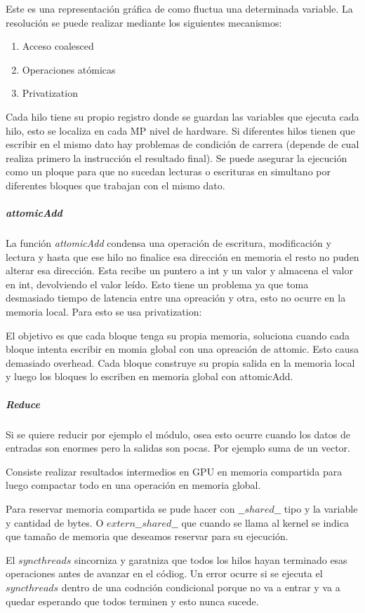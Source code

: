 \documentclass[]{scrartcl}
\begin{document}
Este es una representación gráfica de como fluctua una determinada variable. La resolución se puede realizar mediante los siguientes mecanismos:

\begin{enumerate}
	\item Acceso coalesced
	\item Operaciones atómicas
	\item Privatization
\end{enumerate}

Cada hilo tiene su propio registro donde se guardan las variables que ejecuta cada hilo, esto se localiza en cada MP nivel de hardware. Si diferentes hilos tienen que escribir en el mismo dato hay problemas de condición de carrera (depende de cual realiza primero la instrucción el resultado final). Se puede asegurar la ejecución como un ploque para que no sucedan lecturas o escrituras en simultano por diferentes bloques que trabajan con el mismo dato.
\subparagraph{attomicAdd}
La función \emph{attomicAdd} condensa una operación de escritura, modificación y lectura y hasta que ese hilo no finalice esa dirección en memoria el resto no puden alterar esa dirección. Esta recibe un puntero a int y un valor y almacena el valor en int, devolviendo el valor leído. Esto tiene un problema ya que toma desmasiado tiempo de latencia entre una opreación y otra, esto no ocurre en la memoria local. Para esto se usa privatization:

El objetivo es que cada bloque tenga su propia memoria, soluciona cuando cada bloque intenta escribir en momia global con una opreación de attomic. Esto causa demasiado overhead. Cada bloque construye su propia salida en la memoria local y luego los bloques lo escriben en memoria global con attomicAdd. 

\subparagraph{Reduce}
Si se quiere reducir por ejemplo el módulo, osea esto ocurre cuando los datos de entradas son enormes pero la salidas son pocas. Por ejemplo suma de un vector. 

Consiste realizar resultados intermedios en GPU en memoria compartida para luego compactar todo en una operación en memoria global.
  
Para reservar memoria compartida se pude hacer con $\_\_shared\_\_$ tipo y la variable y cantidad de bytes. O $extern\_\_shared\_\_$ que cuando se llama al kernel se indica que tamaño de memoria que deseamos reservar para su ejecución. 

El $syncthreads$ sincorniza y garatniza que todos los hilos hayan terminado esas operaciones antes de avanzar en el códiog. Un error ocurre si se ejecuta el $syncthreads$ dentro de una codnción condicional porque no va a entrar y va a quedar esperando que todos terminen y esto nunca sucede. 
\end{document}

